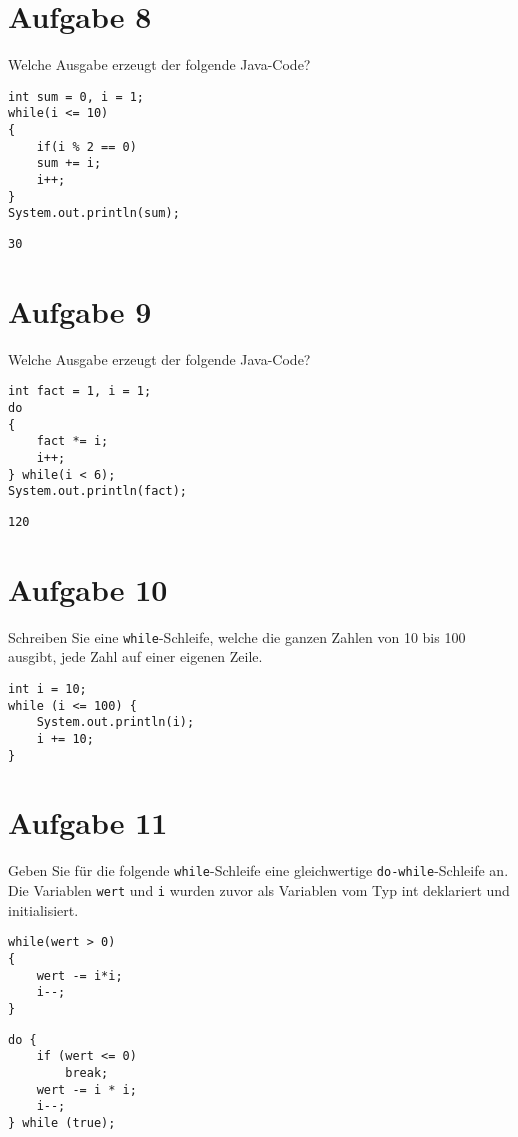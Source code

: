 \documentclass[10pt, oneside]{article}
\begin{document}
\section{Aufgabe 8}

Welche Ausgabe erzeugt der folgende Java-Code?

\begin{verbatim}
int sum = 0, i = 1;
while(i <= 10)
{
    if(i % 2 == 0)
    sum += i;
    i++;
}
System.out.println(sum);
\end{verbatim}

\verb|30|

\section{Aufgabe 9}

Welche Ausgabe erzeugt der folgende Java-Code?

\begin{verbatim}
int fact = 1, i = 1;
do
{
    fact *= i;
    i++;
} while(i < 6);
System.out.println(fact);
\end{verbatim}

\verb|120|

\section{Aufgabe 10}

Schreiben Sie eine \verb|while|-Schleife, welche die ganzen Zahlen von 10 bis
100 ausgibt, jede Zahl auf einer eigenen Zeile.

\begin{verbatim}
int i = 10;
while (i <= 100) {
    System.out.println(i);
    i += 10;
}
\end{verbatim}

\section{Aufgabe 11}

Geben Sie für die folgende \verb|while|-Schleife eine gleichwertige
\verb|do-while|-Schleife an. Die Variablen \verb|wert| und \verb|i| wurden
zuvor als Variablen vom Typ int deklariert und initialisiert.

\begin{verbatim}
while(wert > 0)
{
    wert -= i*i;
    i--;
}
\end{verbatim}

\begin{verbatim}
do {
    if (wert <= 0)
        break;
    wert -= i * i;
    i--;
} while (true);
\end{verbatim}
\end{document}
